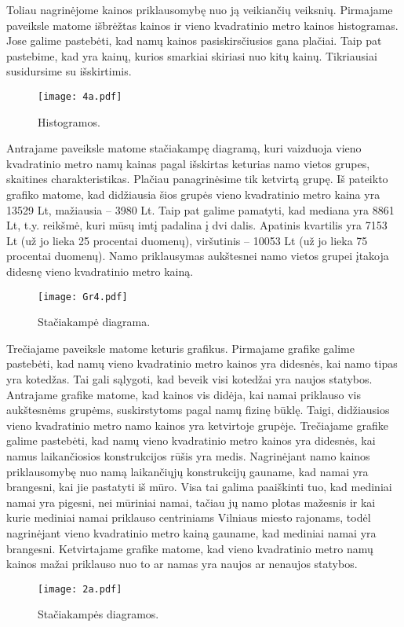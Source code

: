 \documentclass[a4paper]{article}
\begin{document}
\hspace*{0,52cm}Toliau nagrinėjome kainos priklausomybę nuo ją veikiančių veiksnių. Pirmajame paveiksle matome išbrėžtas kainos ir vieno kvadratinio metro kainos histogramas. Jose galime pastebėti, kad namų kainos pasiskirsčiusios gana plačiai. Taip pat pastebime, kad yra kainų, kurios smarkiai skiriasi nuo kitų kainų. Tikriausiai susidursime su išskirtimis.
\begin{figure}[H]
  \caption{Histogramos.}
  \centering
    \texttt{[image: 4a.pdf]}
\end{figure}

\hspace*{0,52cm}Antrajame paveiksle matome stačiakampę diagramą, kuri vaizduoja vieno kvadratinio metro namų kainas pagal išskirtas keturias namo vietos grupes, skaitines charakteristikas. Plačiau panagrinėsime tik ketvirtą grupę. Iš pateikto grafiko matome, kad didžiausia šios grupės vieno kvadratinio metro kaina yra 13529 Lt, mažiausia -- 3980 Lt. Taip pat galime pamatyti, kad mediana yra 8861 Lt, t.y. reikšmė, kuri mūsų imtį padalina į dvi dalis. Apatinis kvartilis yra 7153 Lt (už jo lieka 25 procentai duomenų),  viršutinis -- 10053 Lt (už jo lieka 75 procentai duomenų). Namo priklausymas aukštesnei namo vietos grupei įtakoja didesnę vieno kvadratinio metro kainą.
\begin{figure}[H] 
  \caption{Stačiakampė diagrama.}
  \centering
    \texttt{[image: Gr4.pdf]}
\end{figure}

\hspace*{0,52cm}Trečiajame paveiksle matome keturis grafikus. Pirmajame grafike galime pastebėti, kad namų vieno kvadratinio metro kainos yra didesnės, kai namo tipas yra kotedžas. Tai gali sąlygoti, kad beveik visi kotedžai yra naujos statybos. Antrajame grafike matome, kad kainos vis didėja, kai namai priklauso vis aukštesnėms grupėms, suskirstytoms pagal namų fizinę būklę. Taigi, didžiausios vieno kvadratinio metro namo kainos yra ketvirtoje grupėje. Trečiajame grafike galime pastebėti, kad namų vieno kvadratinio metro kainos yra didesnės, kai namus laikančiosios konstrukcijos rūšis yra medis. Nagrinėjant namo kainos priklausomybę nuo namą laikančiųjų konstrukcijų gauname, kad namai yra brangesni, kai jie pastatyti iš mūro. Visa tai galima paaiškinti tuo, kad mediniai namai yra pigesni, nei mūriniai namai, tačiau jų namo plotas mažesnis ir kai kurie mediniai namai priklauso centriniams Vilniaus miesto rajonams, todėl nagrinėjant vieno kvadratinio metro kainą gauname, kad mediniai namai yra brangesni. Ketvirtajame grafike matome, kad vieno kvadratinio metro namų kainos mažai priklauso nuo to ar namas yra naujos ar nenaujos statybos.
\begin{figure}[H]
  \caption{Stačiakampės diagramos.}
  \centering
    \texttt{[image: 2a.pdf]}
\end{figure}
\end{document}
